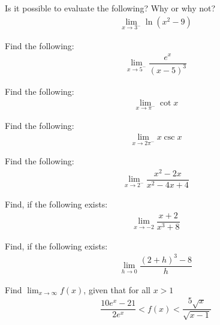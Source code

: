 \begin{exercise}
Is it possible to evaluate the following? Why or why not?
\begin{align*}
    \lim_{x \longrightarrow 3^{-}} \ln(x^{2} - 9)
\end{align*}
\end{exercise}

\begin{exercise}
Find the following:
\begin{align*}
    \lim_{x \longrightarrow 5^{-}} \dfrac{e^{x}}{(x-5)^{3}}
\end{align*}
\end{exercise}

\begin{exercise}
Find the following:
\begin{align*}
    \lim_{x \longrightarrow \pi^{-}} \cot x
\end{align*}
\end{exercise}

\begin{exercise}
Find the following:
\begin{align*}
    \lim_{x \longrightarrow 2\pi^{-}} x\csc x
\end{align*}
\end{exercise}

\begin{exercise}
Find the following:
\begin{align*}
    \lim_{x \longrightarrow 2^{-}} \dfrac{x^{2}-2x}{x^{2}-4x+4}
\end{align*}
\end{exercise}

\begin{exercise}
Find, if the following exists:
\begin{align*}
    \lim_{x \longrightarrow -2} \dfrac{x+2}{x^{3}+8}
\end{align*}
\end{exercise}

\begin{exercise}
Find, if the following exists:
\begin{align*}
    \lim_{h \longrightarrow 0} \dfrac{(2+h)^{3}-8}{h}
\end{align*}
\end{exercise}

\begin{exercise}
Find $\lim_{x \longrightarrow \infty} f(x)$, given that for all $x>1$
\begin{align*}
    \dfrac{10e^{x} - 21}{2e^{x}} < f(x) < \dfrac{5\sqrt{x}}{\sqrt{x-1}}
\end{align*}
\end{exercise}

